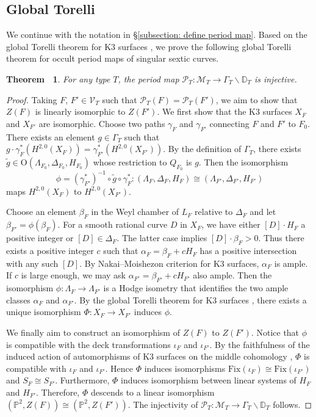 \documentclass[12pt,reqno,a4paper]{amsart}
\newtheorem{thm}{Theorem~}[section]
\theoremstyle{remark}
\theoremstyle{definition}
\newcommand{\PP}{\mathbb{P}}
\newcommand{\DD}{\mathbb{D}}
\newcommand{\Prd}{\mathscr{P}}
\newcommand{\calM}{\mathcal{M}}
\newcommand{\calV}{\mathcal{V}}
\newcommand\Or{\mathrm{O}}
\newcommand{\Fix}{\mathrm{Fix}}
\newcommand{\bs}{\backslash}
\begin{document}
\subsection{Global Torelli}
We continue with the notation in \S\ref{subsection: define period map}. Based on the global Torelli theorem for K3 surfaces \cite{burns1975torelli}, we prove the following global Torelli theorem for occult period maps of singular sextic curves.
\begin{thm}
\label{theorem: global torelli}
For any type $T$, the period map $\Prd_T\colon \calM_T \to \Gamma_{T}\bs \DD_T$ is injective.
\end{thm}
\begin{proof}
 Taking $F$, $F'\in \calV_T$ such that $\Prd_T(F)=\Prd_T(F')$, we aim to show that $Z(F)$ is linearly isomorphic to $Z(F')$. We first show that the K3 surfaces $X_F$ and $X_{F'}$ are isomorphic.
Choose two paths $\gamma_F$ and $\gamma_{F'}$ connecting $F$ and $F'$ to $F_0$.
There exists an element $g\in \Gamma_{T}$ such that $g\cdot\gamma_F^*(H^{2,0}(X_F))=\gamma_{F'}^*(H^{2,0}(X_{F'}))$.
By the definition of $\Gamma_{T}$, there exists $\widetilde{g}\in \Or(\Lambda_{F_0}, \Delta_{F_0},H_{F_0})$ whose restriction to $Q_{F_0}$ is $g$.
Then the isomorphism 
\[
\phi=(\gamma_{F'}^*)^{-1}\circ \widetilde{g}\circ \gamma_F^* \colon (\Lambda_F, \Delta_F, H_F)\cong (\Lambda_{F'}, \Delta_{F'}, H_{F'})
\]  
maps $H^{2,0}(X_F)$ to $H^{2,0}(X_{F'})$.

Choose an element $\beta_F$ in the Weyl chamber of $L_F$ relative to $\Delta_F$ and let $\beta_{F'}=\phi(\beta_F)$. For a smooth rational curve $D$ in $X_F$, we have either $[D]\cdot H_F$ a positive integer or $[D]\in \Delta_F$. The latter case implies $[D]\cdot \beta_F>0$. Thus there exists a positive integer $c$ such that $\alpha_F=\beta_F+cH_F$ has a positive intersection with any such $[D]$. By Nakai--Moishezon criterion for K3 surfaces, $\alpha_F$ is ample. If $c$ is large enough, we may ask $\alpha_{F'}=\beta_{F'}+cH_{F'}$ also ample. 
Then the isomorphism $\phi\colon \Lambda_F\to \Lambda_{F'}$ is a Hodge isometry that identifies the two ample classes $\alpha_F$ and $\alpha_{F'}$. By the global Torelli theorem for K3 surfaces \cite{burns1975torelli}, there exists a unique isomorphism $\Phi\colon X_F\to X_{F'}$ induces $\phi$. 

We finally aim to construct an isomorphism of $Z(F)$ to $Z(F')$.
Notice that $\phi$ is compatible with the deck transformations $\iota_F$ and $\iota_{F'}$. By the faithfulness of the induced action of automorphisms of K3 surfaces on the middle cohomology \cite{looijenga1980torelli}, $\Phi$ is compatible with $\iota_F$ and $\iota_{F'}$.
Hence $\Phi$ induces isomorphisms $\Fix(\iota_F)\cong \Fix(\iota_{F'})$ and $S_F\cong S_{F'}$. Furthermore, $\Phi$ induces isomorphism between linear systems of $H_F$ and $H_{F'}$. Therefore, $\Phi$ descends to a linear isomorphism $(\PP^2, Z(F))\cong (\PP^2, Z(F'))$. The injectivity of $\Prd_T\colon\calM_T\to \Gamma_T\bs \DD_T$ follows.
\end{proof}
\end{document}
